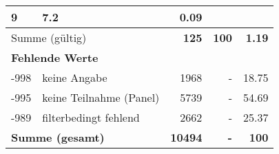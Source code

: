\begin{longtable}{lXrrr}
       \num{9} &
       \num[round-mode=places,round-precision=2]{7.2} &
         \num[round-mode=places,round-precision=2]{0.09} \\
     \midrule
     \multicolumn{2}{l}{Summe (gültig)} &
       \textbf{\num{125}} &
     \textbf{\num{100}} &
       \textbf{\num[round-mode=places,round-precision=2]{1.19}} \\
     \multicolumn{5}{l}{\textbf{Fehlende Werte}}\\
       -998 &
       keine Angabe &
         \num{1968} &
        - &
         \num[round-mode=places,round-precision=2]{18.75} \\
       -995 &
       keine Teilnahme (Panel) &
         \num{5739} &
        - &
         \num[round-mode=places,round-precision=2]{54.69} \\
       -989 &
       filterbedingt fehlend &
         \num{2662} &
        - &
         \num[round-mode=places,round-precision=2]{25.37} \\
     \midrule
     \multicolumn{2}{l}{\textbf{Summe (gesamt)}} &
          \textbf{\num{10494}} &
        \textbf{-} &
        \textbf{\num{100}} \\
     \bottomrule
     \end{longtable}
     
